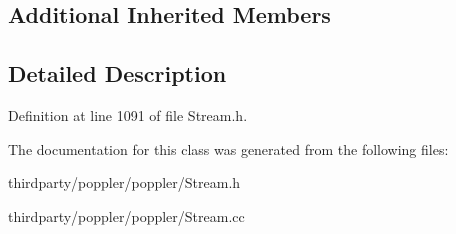 \subsection*{Additional Inherited Members}


\subsection{Detailed Description}


Definition at line 1091 of file Stream.\+h.



The documentation for this class was generated from the following files\+:\begin{DoxyCompactItemize}
\item 
thirdparty/poppler/poppler/Stream.\+h\item 
thirdparty/poppler/poppler/Stream.\+cc\end{DoxyCompactItemize}
